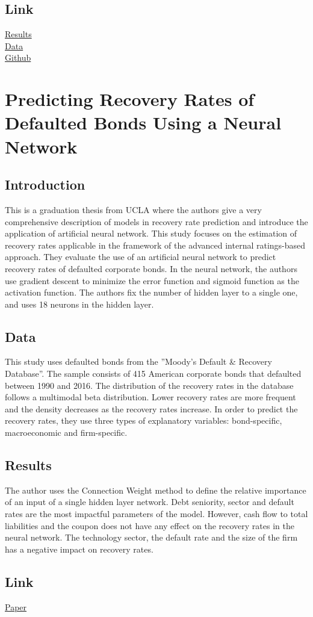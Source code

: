 \documentclass{article}
\begin{document}
\subsection{Link}
\href{https://towardsdatascience.com/default-risk-using-deep-learning-6924cdada04d}{Results}\\
\href{https://www.kaggle.com/c/home-credit-default-risk/data}{Data}\\
\href{https://github.com/jayborkar/Home-Credit}{Github}

\section{Predicting Recovery Rates of Defaulted Bonds Using a Neural Network}
\subsection{Introduction}
This is a graduation thesis from UCLA where the authors give a very comprehensive description of models in recovery rate prediction and introduce the application of artificial neural network. This study focuses on the estimation of recovery rates applicable in the
framework of the advanced internal ratings-based approach. They evaluate the use of an artificial neural network to predict recovery rates of defaulted corporate bonds. 
In the neural network, the authors use gradient descent to minimize the error function and sigmoid function as the activation function. The authors fix the number of hidden layer to a single one, and uses 18 neurons in the hidden layer. 
\subsection{Data}
This study uses defaulted bonds from the ”Moody’s Default & Recovery
Database”. The sample consists of 415 American corporate bonds that defaulted between 1990 and 2016. The distribution of the recovery rates in the database follows a multimodal beta distribution. Lower recovery rates are more frequent and the density decreases as the recovery rates increase. In order to predict the recovery rates, they use three types of explanatory variables: bond-specific, macroeconomic and firm-specific.
\subsection{Results}
The author uses the Connection Weight method to define the relative importance of an input of a single hidden layer network. Debt seniority, sector and default rates are the most impactful parameters of the model. However, cash flow to total liabilities and the coupon does not have any effect on the recovery rates in the neural network. The technology sector, the default rate and the size of the firm has a negative impact on recovery rates.
\subsection{Link}
\href{https://dial.uclouvain.be/memoire/ucl/en/object/thesis%3A14378/datastream/PDF_01/view}{Paper}\\
\end{document}
